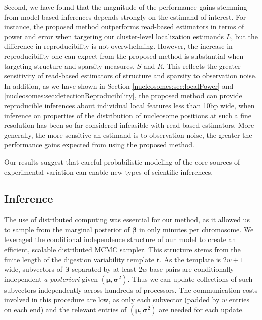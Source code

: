Second, 
 we have found that the magnitude of the performance gains stemming from model-based inferences depends strongly on the estimand of interest.
%
For instance, the proposed method outperforms read-based estimators in terms of power and error when targeting our cluster-level localization estimands $L$, but the difference in reproducibility is not overwhelming.
However, the increase in reproducibility one can expect from the proposed method is substantial when targeting structure and sparsity measures, $S$ and $R$.
This reflects the greater sensitivity of read-based estimators of structure and sparsity to observation noise.
%
In addition, as we have shown in Section \ref{nucleosomes:sec:localPower} and \ref{nucleosomes:sec:detectionReproducibility}, the proposed method can  provide  reproducible inferences about individual local features less than 10bp wide, when inference on properties of the distribution of nucleosome positions at such a fine resolution has been so far considered infeasible with read-based estimators.
%
More generally, the more sensitive an estimand is to observation noise, the greater the performance gains expected from using the proposed method.

Our results suggest that careful probabilistic modeling of the core sources of experimental variation can enable new types of scientific inferences.

\subsection{Inference}
\label{nucleosomes:sec:remarksInference}


The use of distributed computing was essential for our method, as it allowed us to sample from the marginal posterior of $\bm \beta$ in only minutes per chromosome.
We leveraged the conditional independence structure of our model to create an efficient, scalable distributed MCMC sampler.
This structure stems from the finite length of the digestion variability template $\bm t$.
As the template is $2w + 1$ wide, subvectors of $\bm \beta$ separated by at least $2w$ base pairs are conditionally independent \emph{a posteriori} given $(\bm \mu, \bm \sigma^2)$.
Thus we can update collections of such subvectors independently across hundreds of processors.
The communication costs involved in this procedure are low, as only each  subvector (padded by $w$ entries on each end) and the relevant entries of $(\bm \mu, \bm \sigma^2)$ are needed for each update.

